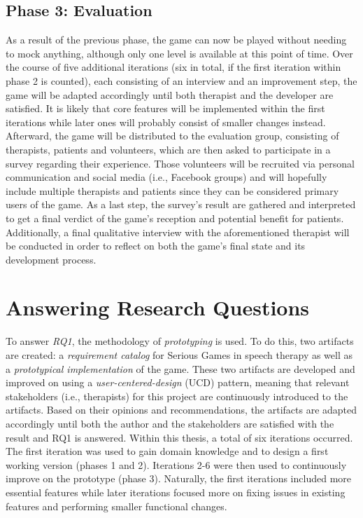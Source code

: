 \documentclass[draft,final]{vutinfth} %
\begin{document}
\subsection{Phase 3: Evaluation}
As a result of the previous phase, the game can now be played without needing to mock anything, although only one level is available at this point of time. Over the course of five additional iterations (six in total, if the first iteration within phase 2 is counted), each consisting of an interview and an improvement step, the game will be adapted accordingly until both therapist and the developer are satisfied. It is likely that core features will be implemented within the first iterations while later ones will probably consist of smaller changes instead. Afterward, the game will be distributed to the evaluation group, consisting of therapists, patients and volunteers, which are then asked to participate in a survey regarding their experience. Those volunteers will be recruited via personal communication and social media (i.e., Facebook groups) and will hopefully include multiple therapists and patients since they can be considered primary users of the game. As a last step, the survey's result are gathered and interpreted to get a final verdict of the game's reception and potential benefit for patients. Additionally, a final qualitative interview with the aforementioned therapist will be conducted in order to reflect on both the game's final state and its development process.


\section{Answering Research Questions}
To answer \emph{RQ1}, the methodology of \emph{prototyping} \cite{wilde2006methodenspektrum} is used. To do this, two artifacts are created: a \emph{requirement catalog} for Serious Games in speech therapy as well as a \emph{prototypical implementation} of the game. These two artifacts are developed and improved on using a \emph{user-centered-design} (UCD) pattern, meaning that relevant stakeholders (i.e., therapists) for this project are continuously introduced to the artifacts. Based on their opinions and recommendations, the artifacts are adapted accordingly until both the author and the stakeholders are satisfied with the result and RQ1 is answered. Within this thesis, a total of six iterations occurred. The first iteration was used to gain domain knowledge and to design a first working version (phases 1 and 2). Iterations 2-6 were then used to continuously improve on the prototype (phase 3). Naturally, the first iterations included more essential features while later iterations focused more on fixing issues in existing features and performing smaller functional changes.
\end{document}

